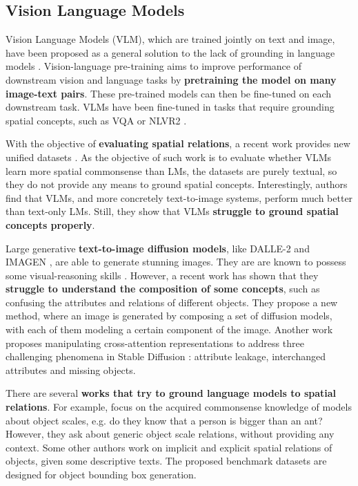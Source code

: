 \subsection{Vision Language Models} \label{sec:vision_language_models}

Vision Language Models (VLM), which are trained jointly on text and image, have been proposed as a general solution to the lack of grounding in language models \cite{lu2019vilbert, tan2020lxmert, ramesh2022hierarchical, saharia2022photorealistic}. Vision-language pre-training aims to improve performance of downstream vision and language tasks by \textbf{pretraining the model on many image-text pairs}. These pre-trained models can then be fine-tuned on each downstream task. VLMs have been fine-tuned in tasks that require grounding spatial concepts, such as VQA \cite{antol2015vqa} or NLVR2 \cite{suhr2018corpus}.

With the objective of \textbf{evaluating spatial relations}, a recent work provides new unified datasets \cite{liu2022things}. As the objective of such work is to evaluate whether VLMs learn more spatial commonsense than LMs, the datasets are purely textual, so they do not provide any means to ground spatial concepts. Interestingly, authors find that VLMs, and more concretely text-to-image systems, perform much better than text-only LMs. Still, they show that VLMs \textbf{struggle to ground spatial concepts properly}.

Large generative \textbf{text-to-image diffusion models}, like DALLE-2 \cite{ramesh2022hierarchical} and IMAGEN \cite{saharia2022photorealistic}, are able to generate stunning images. They are are known to possess some visual-reasoning skills \cite{cho2022dall}. However, a recent work \cite{liu2022compositional} has shown that they \textbf{struggle to understand the composition of some concepts}, such as confusing the attributes and relations of different objects. They propose a new method, where an image is generated by composing a set of diffusion models, with each of them modeling a certain component of the image. Another work \cite{anonymous2023trainingfree} proposes manipulating cross-attention representations to address three challenging phenomena in Stable Diffusion \cite{rombach2021highresolution}: attribute leakage, interchanged attributes and missing objects.

There are several \textbf{works that try to ground language models to spatial relations}. For example, \cite{bagherinezhad2016elephants, elazar2019large} focus on the acquired commonsense knowledge of models about object scales, e.g. do they know that a person is bigger than an ant? However, they ask about generic object scale relations, without providing any context. Some other authors \cite{collell2018acquiring, elu2021inferring} work on implicit and explicit spatial relations of objects, given some descriptive texts. The proposed benchmark datasets are designed for object bounding box generation.

